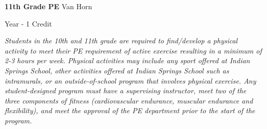\noindent\textbf{11th Grade PE} \hfill Van Horn

\noindent Year - 1 Credit

\vspace{1mm}\emph{Students in the 10th and 11th grade are required to find/develop a physical activity to meet their PE requirement of active exercise resulting in a minimum of 2-3 hours per week.  Physical activities may include any sport offered at Indian Springs School, other activities offered at Indian Springs School such as intramurals, or an outside-of-school program that involves physical exercise.  Any student-designed program must have a supervising instructor, meet two of the three components of fitness (cardiovascular endurance, muscular endurance and flexibility), and meet the approval of the PE department prior to the start of the program.}\\

